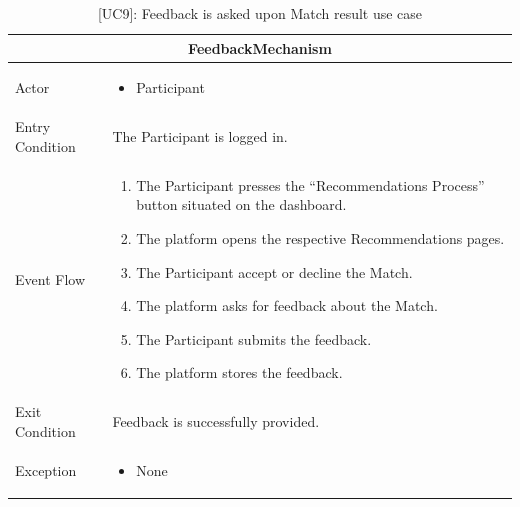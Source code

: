 \begin{table}[H]
    \centering
    \begin{tabular}{|p{3cm}|p{12cm}|}
    \hline
    \multicolumn{2}{|c|}{\textbf{FeedbackMechanism}} \\ \hline
    Actor & 
    \begin{itemize}
        \item Participant
    \end{itemize}\\ \hline
    Entry Condition & The Participant is logged in. \\ \hline
    Event Flow &      
    \begin{enumerate}         
        \item The Participant presses the “Recommendations Process” button situated on the dashboard.
        \item The platform opens the respective Recommendations pages.
        \item The Participant accept or decline the Match.
        \item The platform asks for feedback about the Match.
        \item The Participant submits the feedback.
        \item The platform stores the feedback.
    \end{enumerate} \\ \hline
    Exit Condition & Feedback is successfully provided. \\ \hline
    Exception & 
    \begin{itemize}     
        \item None
    \end{itemize} \\ \hline
    \end{tabular}
    \caption{[UC9]: Feedback is asked upon Match result use case}
    \label{tab:UC9}
\end{table}

